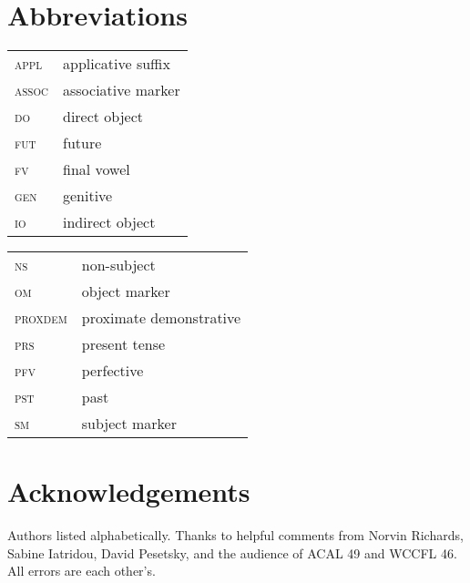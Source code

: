 \documentclass[output=paper,colorlinks,citecolor=brown]{langscibook}
\begin{document}
\section*{Abbreviations}
\begin{tabularx}{.45\textwidth}{lQ}
\textsc{appl}  &  applicative suffix\\
 \textsc{assoc}  &  associative marker\\
 \textsc{do}  &  direct object\\
 \textsc{fut}  &  future\\
 \textsc{fv}  &  final vowel\\
 \textsc{gen}  &  genitive\\
 \textsc{io}  &  indirect object\\
 \end{tabularx}
\begin{tabularx}{.45\textwidth}{lQ}
 \textsc{ns}  &  non-subject\\
 \textsc{om}  &  object marker\\
 \textsc{proxdem}  &  proximate demonstrative\\
 \textsc{prs} \ &  present tense\\
 \textsc{pfv}  &  perfective\\
 \textsc{pst}  &  past\\
 \textsc{sm}  &  subject marker
\end{tabularx}


\section*{Acknowledgements}

Authors listed alphabetically. Thanks to helpful comments from Norvin Richards, Sabine Iatridou, David Pesetsky, and the audience of ACAL 49 and WCCFL 46. All errors are each other's.


\printbibliography[heading=subbibliography,notkeyword=this]
\end{document}
